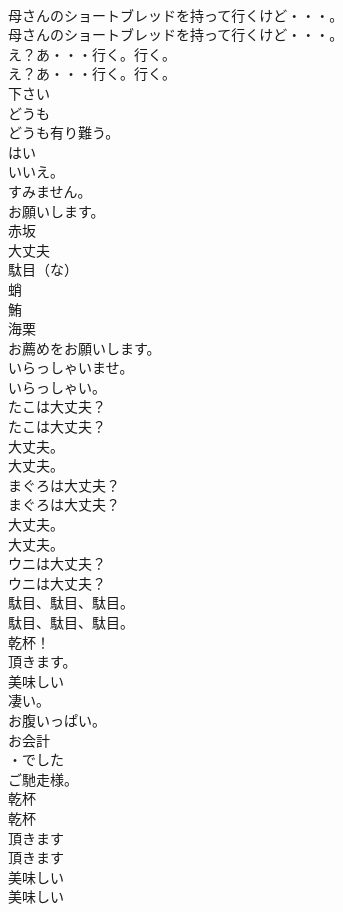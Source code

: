 \documentclass[8pt]{extreport}
\begin{document}
\begin{CJK}{UTF8}{min}
\\	母さんのショートブレッドを持って行くけど・・・。	
\\	母さんのショートブレッドを持って行くけど・・・。 
\\	え？あ・・・行く。行く。	
\\	え？あ・・・行く。行く。 
\\	下さい
\\	どうも
\\	どうも有り難う。
\\	はい
\\	いいえ。
\\	すみません。
\\	お願いします。
\\	赤坂
\\	大丈夫
\\	駄目（な）
\\	蛸
\\	鮪
\\	海栗
\\	お薦めをお願いします。
\\	いらっしゃいませ。
\\	いらっしゃい。
\\	たこは大丈夫？	
\\	たこは大丈夫？ 
\\	大丈夫。	
\\	大丈夫。 
\\	まぐろは大丈夫？	
\\	まぐろは大丈夫？ 
\\	大丈夫。	
\\	大丈夫。 
\\	ウニは大丈夫？	
\\	ウニは大丈夫？ 
\\	駄目、駄目、駄目。	
\\	駄目、駄目、駄目。 
\\	乾杯！
\\	頂きます。
\\	美味しい
\\	凄い。
\\	お腹いっぱい。
\\	お会計
\\	・でした 
\\	ご馳走様。
\\	乾杯	
\\	乾杯 
\\	頂きます	
\\	頂きます 
\\	美味しい	
\\	美味しい 

\end{CJK}
\end{document}
